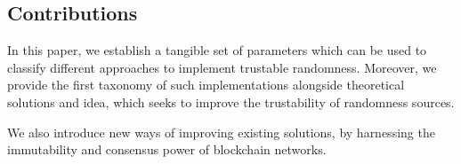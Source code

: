 \subsection*{Contributions}\label{subsec:contributions}
In this paper, we establish a tangible set of parameters which can be used to classify different approaches to implement trustable randomness.
Moreover, we provide the first taxonomy of such implementations alongside theoretical solutions and idea, which seeks to improve the trustability of randomness sources.

We also introduce new ways of improving existing solutions, by harnessing the immutability and consensus power of blockchain networks.

